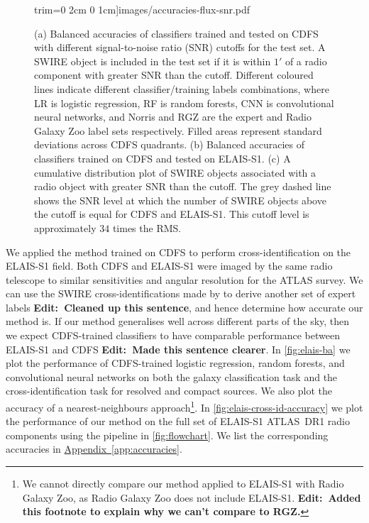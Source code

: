 \documentclass[fleqn,usenatbib,usedcolumn]{mnras}
\newcommand{\edit}[1]{{\bf Edit:~{#1}}}
\newcommand{\aref}[1]{\hyperref[#1]{Appendix~\ref{#1}}}
\begin{document}
\begin{figure}
                     trim={0 2cm 0 1cm}]{images/accuracies-flux-snr.pdf}
    \caption{(a) Balanced accuracies of classifiers trained and tested on CDFS
      with different signal-to-noise ratio (SNR) cutoffs for the test set. A
      SWIRE object is included in the test set if it is within $1'$ of a radio
      component with greater SNR than the cutoff. Different coloured lines
      indicate different classifier/training labels combinations, where LR is
      logistic regression, RF is random forests, CNN is convolutional neural
      networks, and Norris and RGZ are the expert and Radio Galaxy Zoo label
      sets respectively. Filled areas represent standard deviations across
      CDFS quadrants. (b) Balanced accuracies of classifiers trained on CDFS
      and tested on ELAIS-S1. (c) A cumulative distribution plot of SWIRE
      objects associated with a radio object with greater SNR than the cutoff.
      The grey dashed line shows the SNR level at which the number of SWIRE
      objects above the cutoff is equal for CDFS and ELAIS-S1. This cutoff level
      is approximately $34$ times the RMS.}
    \label{fig:accuracies-flux}
  \end{figure}

  We applied the method trained on CDFS to perform cross-identification on the ELAIS-S1 field. Both CDFS and ELAIS-S1 were imaged by the same radio telescope to similar sensitivities and angular resolution for the ATLAS survey. We can use the SWIRE cross-identifications made by \citet{middelberg08} to derive another set of expert labels \edit{Cleaned up this sentence}, and hence determine how accurate our method is. If our method generalises well across different parts of the sky, then we expect CDFS-trained classifiers to have comparable performance between ELAIS-S1 and CDFS \edit{Made this sentence clearer}. In \autoref{fig:elais-ba} we plot the performance of CDFS-trained logistic regression, random forests, and convolutional neural networks on both the galaxy classification task and the cross-identification task for resolved and compact sources. We also plot the accuracy of a nearest-neighbours approach\footnote{We cannot directly compare our method applied to ELAIS-S1 with Radio Galaxy Zoo, as Radio Galaxy Zoo does not include ELAIS-S1. \edit{Added this footnote to explain why we can't compare to RGZ.}}. In \autoref{fig:elais-cross-id-accuracy} we plot the performance of our method on the full set of ELAIS-S1 ATLAS~DR1 radio components using the pipeline in \autoref{fig:flowchart}. We list the corresponding accuracies in \aref{app:accuracies}.
\end{document}
